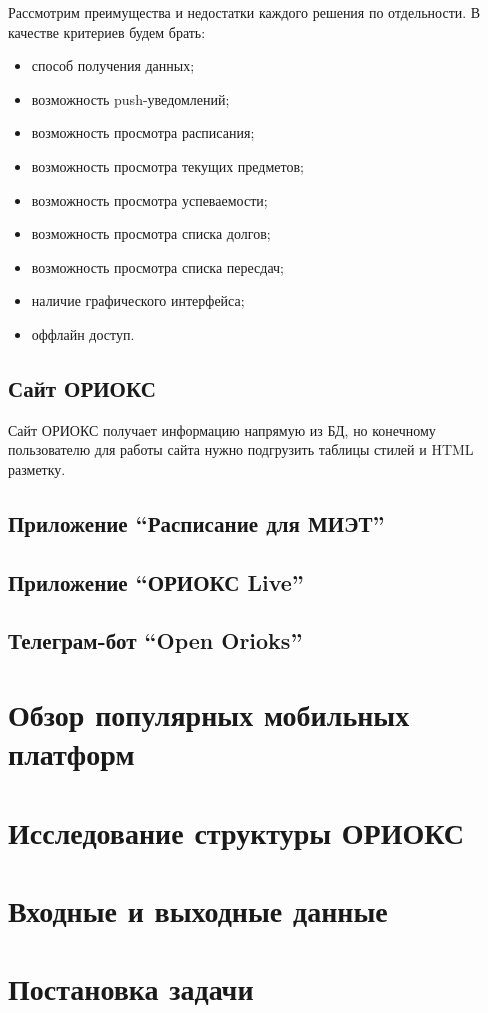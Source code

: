 Рассмотрим преимущества и недостатки каждого решения по отдельности.
В качестве критериев будем брать:
\begin{itemize}
  \item способ получения данных;
  \item возможность push-уведомлений;
  \item возможность просмотра расписания;
  \item возможность просмотра текущих предметов;
  \item возможность просмотра успеваемости;
  \item возможность просмотра списка долгов;
  \item возможность просмотра списка пересдач;
  \item наличие графического интерфейса;
  \item оффлайн доступ.
\end{itemize}

\subsection{Сайт ОРИОКС}
\label{subsec:orioks}

Сайт ОРИОКС получает информацию напрямую из БД, но конечному пользователю для работы сайта нужно подгрузить таблицы стилей и HTML разметку.


\subsection{Приложение ``Расписание для МИЭТ''}
\label{subsec:appMietSchedule}

\subsection{Приложение ``ОРИОКС Live''}
\label{subsec:appOrioksLive}

\subsection{Телеграм-бот ``Open Orioks''}
\label{subsec:botOpenOrioks}

\section{Обзор популярных мобильных платформ}
\label{sec:platforms}

\section{Исследование структуры ОРИОКС}
\label{sec:orioksStructure}

\section{Входные и выходные данные}
\label{sec:io}

\section{Постановка задачи}
\label{sec:problem}
